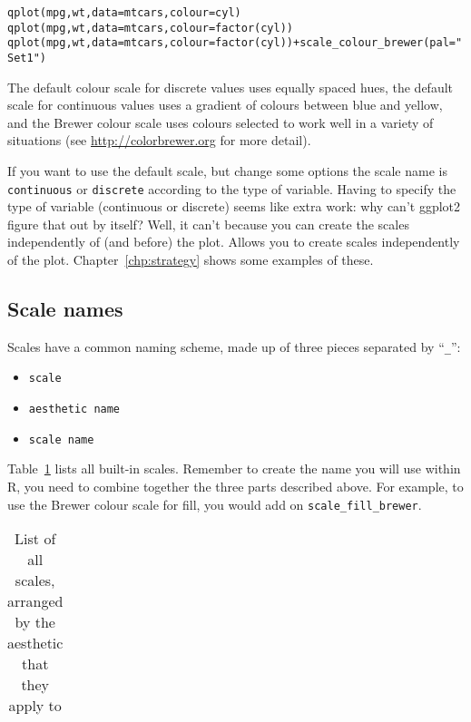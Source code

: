 \begin{alltt}
  qplot(mpg, wt, data=mtcars, colour=cyl)
  qplot(mpg, wt, data=mtcars, colour=factor(cyl))
  qplot(mpg, wt, data=mtcars, colour=factor(cyl)) + scale_colour_brewer(pal="Set1")
\end{alltt}

The default colour scale for discrete values uses equally spaced hues, the default scale for continuous values uses a gradient of colours between blue and yellow, and the Brewer colour scale uses colours selected to work well in a variety of situations (see \url{http://colorbrewer.org} for more detail).

If you want to use the default scale, but change some options the scale name is {\tt continuous} or {\tt discrete} according to the type of variable.  Having to specify the type of variable (continuous or discrete) seems like extra work: why can't ggplot2 figure that out by itself?  Well, it can't because you can create the scales independently of (and before) the plot.  Allows you to create scales independently of the plot.  Chapter~\ref{chp:strategy} shows some examples of these.


\subsection{Scale names}
\label{sub:scale_names}

Scales have a common naming scheme, made up of three pieces separated by ``{\tt \_}'':

\begin{itemize}
  \item {\tt scale}
  \item {\tt aesthetic name}
  \item {\tt scale name}
\end{itemize}

Table~\ref{tbl:scale_list} lists all built-in scales.  Remember to create the name you will use within R, you need to combine together the three parts described above.  For example, to use the Brewer colour scale for fill, you would add on {\tt scale\_fill\_brewer}.  

\begin{table}
  \begin{center}
  \begin{tabular}{c}
    
  \end{tabular}
  \end{center}
  \caption{List of all scales, arranged by the aesthetic that they apply to}
  \label{tbl:scale_list}
\end{table}

